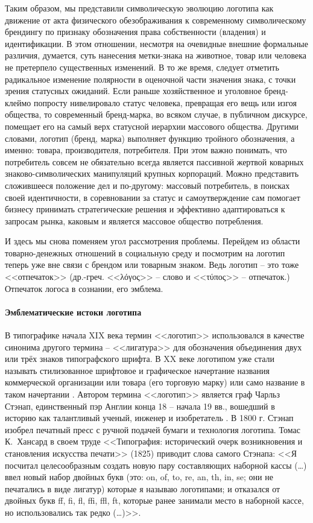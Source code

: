 Таким образом, мы представили символическую эволюцию логотипа как движение
от акта физического обезображивания к современному символическому брендингу по
признаку обозначения  права собственности (владения) и идентификации. В этом отношении,
несмотря на очевидные внешние формальные различия, думается, суть нанесения метки-знака
на животное, товар или человека не претерпело существенных изменений. В то же время,
следует отметить радикальное изменение полярности в оценочной части значения знака,
с точки зрения статусных ожиданий. Если раньше хозяйственное и уголовное бренд-клеймо
попросту нивелировало статус человека, превращая его вещь или изгоя общества, то
современный бренд-марка, во всяком случае, в публичном дискурсе, помещает его
на самый верх статусной иерархии массового общества.  Другими словами, логотип
(бренд, марка) выполняет функцию тройного обозначения, а именно: товара,
производителя, потребителя. При этом важно понимать, что потребитель совсем
не обязательно всегда является пассивной жертвой коварных знаково-символических
манипуляций крупных корпораций. Можно представить сложившееся положение дел и
по-другому: массовый потребитель, в поисках своей идентичности, в соревновании за
статус и самоутверждение сам помогает бизнесу принимать стратегические решения и
эффективно адаптироваться к запросам рынка, каковым и является массовое общество потребления.

И здесь мы снова поменяем угол рассмотрения проблемы. Перейдем из области товарно-денежных
отношений в социальную среду и посмотрим на логотип  теперь уже вне связи с брендом или
товарным знаком. Ведь логотип -- это тоже <<отпечаток>>
(др.-греч. <<\foreignlanguage{greek}{λόγος}>> -- слово
и <<\foreignlanguage{greek}{τύπος}>> -- отпечаток.) Отпечаток логоса в сознании, его эмблема.

\paragraph{Эмблематические  истоки логотипа}
В типографике начала XIX века термин <<логотип>> использовался в качестве синонима
другого термина -- <<лигатура>> для обозначения объединения двух или трёх знаков
типографского шрифта. В XX веке логотипом уже стали называть стилизованное
шрифтовое и графическое начертание названия коммерческой организации или товара
(его торговую марку) или само название в таком начертании \autocite[][50]{lebedev2013logos}.
Автором термина <<логотип>> является граф Чарльз Стэнап, единственный пэр Англии
конца 18 -- начала 19 вв., вошедший в историю как талантливый ученый, инженер и
изобретатель \autocite[][50]{lebedev2013logos}. В 1800 г. Стэнап изобрел печатный пресс с ручной
подачей бумаги и технология логотипа. Томас К.~Хансард в своем труде <<Типография:
исторический очерк возникновения и становления искусства печати>> (1825) приводит слова
самого Стэнапа: <<Я посчитал целесообразным создать новую пару составляющих наборной
кассы (\ldots) ввел новый набор двойных букв (это: on, of, to, re, an, th, in, se; они
не печатались в виде лигатур) которые я называю логотипами; и отказался от двойных
букв {ff}, {fi}, {fl}, {ffi}, {ffl}, {ft}, которые ранее занимали место в наборной кассе,
но использовались так редко (\ldots)>>\autocite{logotype}.


